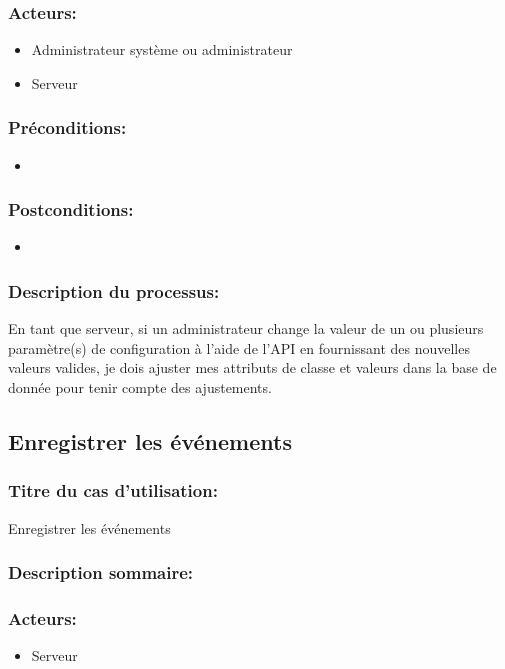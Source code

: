 \documentclass{scrreprt}
\begin{document}
\begin{itemizen}
\subsubsection{Acteurs:} 
\begin{itemize}
    \item Administrateur système ou administrateur
    \item Serveur
\end{itemize}
\subsubsection{Préconditions:}
\begin{itemize}
    \item  
\end{itemize} 
\subsubsection{Postconditions:}
\begin{itemize}
    \item  
\end{itemize} 
\subsubsection{Description du processus:}En tant que serveur, si un administrateur change la valeur de un ou plusieurs paramètre(s)
de configuration à l'aide de l'API en fournissant des nouvelles valeurs valides,
je dois ajuster mes attributs de classe et valeurs dans la base de donnée
pour tenir compte des ajustements.

\subsection{Enregistrer les événements}
\subsubsection{Titre du cas d'utilisation:} Enregistrer les événements
\subsubsection{Description sommaire:}
\subsubsection{Acteurs:}
\begin{itemize}
    \item Serveur
\end{itemize}

\end{itemizen}
\end{document}
